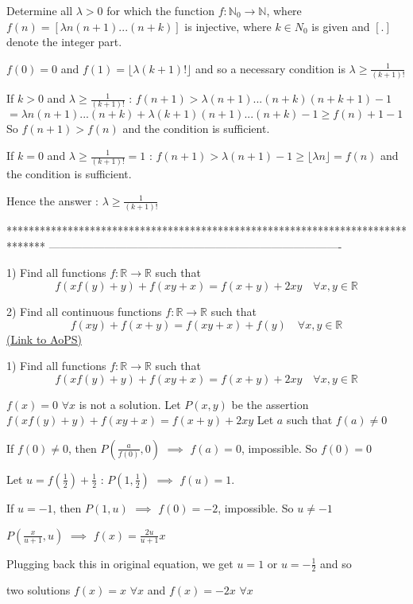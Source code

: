 \begin{solution}
	\begin{tcolorbox}Determine all ${\lambda}>0$ for which the function ${f: \mathbb{N}_0}\to\mathbb{N}$, where $f(n)=[{\lambda}n(n+1)...(n+k)]$ is injective, where $k{\in}N_0$
is given and $[.]$ denote the integer part.\end{tcolorbox}
$f(0)=0$ and $f(1)=\lfloor\lambda (k+1)!\rfloor$ and so a necessary condition is $\lambda\ge \frac 1{(k+1)!}$

If $k>0$ and $\lambda\ge \frac 1{(k+1)!}$ :
$f(n+1)>\lambda(n+1)...(n+k)(n+k+1)-1$ $=\lambda n(n+1)...(n+k)+\lambda(k+1)(n+1)...(n+k)-1\ge f(n)+1-1$
So $f(n+1)>f(n)$ and the condition is sufficient.

If $k=0$ and $\lambda\ge \frac 1{(k+1)!}=1$ :
$f(n+1)>\lambda(n+1)-1\ge \lfloor\lambda n\rfloor= f(n)$ and the condition is sufficient.

Hence the answer : $\boxed{\lambda\ge \frac 1{(k+1)!}}$
\end{solution}
*******************************************************************************
-------------------------------------------------------------------------------

\begin{problem}
	1) Find all functions $f:\mathbb{R}\to\mathbb{R}$ such that
\[f(xf(y)+y)+f(xy+x)=f(x+y)+2xy \quad \forall x,y\in \mathbb{R}\]

2) Find all continuous functions $f:\mathbb{R}\to\mathbb{R}$ such that
\[f(xy)+f(x+y)=f(xy+x)+f(y) \quad \forall x,y\in \mathbb{R}\]
	\flushright \href{https://artofproblemsolving.com/community/c6h561816}{(Link to AoPS)}
\end{problem}



\begin{solution}
	\begin{tcolorbox}1) Find all functions $f:\mathbb{R}\to\mathbb{R}$ such that
\[f(xf(y)+y)+f(xy+x)=f(x+y)+2xy \quad \forall x,y\in \mathbb{R}\]\end{tcolorbox}
$f(x)=0$ $\forall x$ is not a solution.
Let $P(x,y)$ be the assertion $f(xf(y)+y)+f(xy+x)=f(x+y)+2xy$
Let $a$ such that $f(a)\ne 0$

If $f(0)\ne 0$, then $P(\frac a{f(0)},0)$ $\implies$ $f(a)=0$, impossible. So $f(0)=0$

Let $u=f(\frac 12)+\frac 12$ : $P(1,\frac 12)$ $\implies$ $f(u)=1$.

If $u=-1$, then $P(1,u)$ $\implies$ $f(0)=-2$, impossible. So $u\ne -1$

$P(\frac x{u+1},u)$ $\implies$ $f(x)=\frac{2u}{u+1}x$

Plugging back this in original equation, we get $u=1$ or $u=-\frac 12$ and so

two solutions $\boxed{f(x)=x}$ $\forall x$ and $\boxed{f(x)=-2x}$ $\forall x$
\end{solution}



